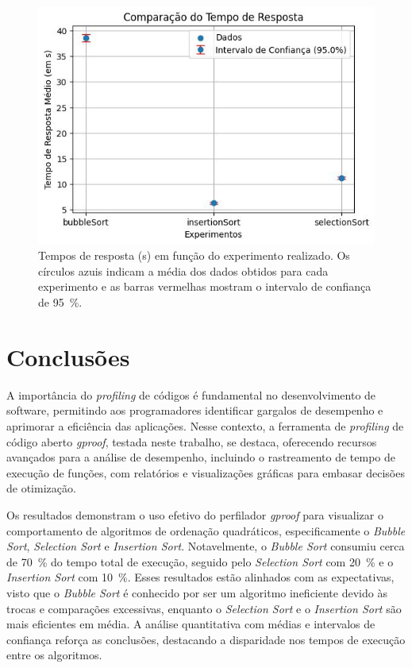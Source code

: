 \documentclass[12pt,a4paper]{article}
\begin{document}
\begin{figure}[H]
\centering
\includegraphics[width=0.90\linewidth]{Figures/media_confianca.jpg}
\caption{Tempos de resposta (\si{\second}) em função do experimento realizado. Os círculos azuis indicam a média dos dados obtidos para cada experimento e as barras vermelhas mostram o intervalo de confiança de \SI{95}{\percent}.}
\label{fig:media_confianca}
\end{figure}

\section{Conclusões}

A importância do \textit{profiling} de códigos é fundamental no desenvolvimento de software, permitindo aos programadores identificar gargalos de desempenho e aprimorar a eficiência das aplicações. Nesse contexto, a ferramenta de \textit{profiling} de código aberto \textit{gproof}, testada neste trabalho, se destaca, oferecendo recursos avançados para a análise de desempenho, incluindo o rastreamento de tempo de execução de funções, com relatórios e visualizações gráficas para embasar decisões de otimização. 

Os resultados demonstram o uso efetivo do perfilador \textit{gproof} para visualizar o comportamento de algoritmos de ordenação quadráticos, especificamente o \textit{Bubble Sort}, \textit{Selection Sort} e \textit{Insertion Sort}. Notavelmente, o \textit{Bubble Sort} consumiu cerca de \SI{70}{\percent} do tempo total de execução, seguido pelo \textit{Selection Sort} com \SI{20}{\percent} e o \textit{Insertion Sort} com \SI{10}{\percent}. Esses resultados estão alinhados com as expectativas, visto que o \textit{Bubble Sort} é conhecido por ser um algoritmo ineficiente devido às trocas e comparações excessivas, enquanto o \textit{Selection Sort} e o \textit{Insertion Sort} são mais eficientes em média. A análise quantitativa com médias e intervalos de confiança reforça as conclusões, destacando a disparidade nos tempos de execução entre os algoritmos.
\end{document}
